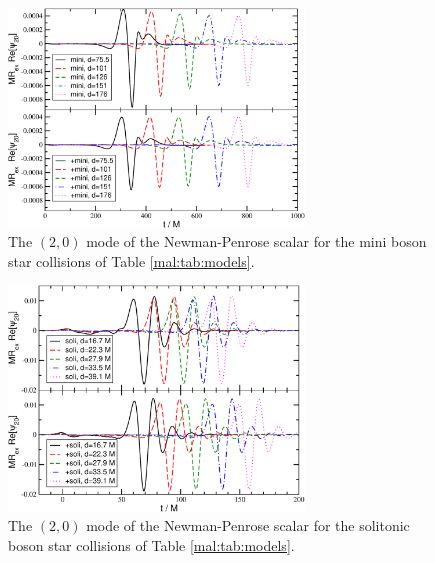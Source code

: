 %
%
\begin{figure}
    \centering
    \includegraphics[width=0.7\textwidth]{malaise_source/mini_psi20.pdf}
    \caption{The $(2,0)$ mode of the Newman-Penrose scalar
    for the mini boson star collisions of Table \ref{mal:tab:models}.
    }
    \label{mal:fig:mini_psi20}
\end{figure}
%
%
\begin{figure}
    \centering
    \includegraphics[width=0.7\textwidth]{malaise_source/soli_psi20.pdf}
    \caption{The $(2,0)$ mode of the Newman-Penrose scalar
    for the solitonic boson star collisions of Table \ref{mal:tab:models}.
    }
    \label{mal:fig:soli_psi20}
\end{figure}
%

